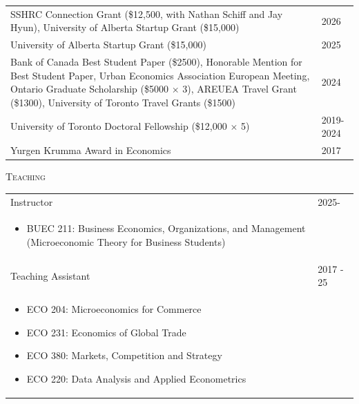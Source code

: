 \documentclass[11pt]{amsart}
\begin{document}
\normalsize 
\begin{tabular}{ p{12.5cm}  p{5cm}}
  SSHRC Connection Grant (\$12,500, with Nathan Schiff and Jay Hyun), University of Alberta Startup Grant (\$15,000) & 2026 \\ 
  University of Alberta Startup Grant (\$15,000) & 2025 \\
  Bank of Canada Best Student Paper (\$2500), Honorable Mention for Best Student Paper, Urban Economics Association European Meeting,   Ontario Graduate Scholarship (\$5000 $\times$ 3),  AREUEA Travel Grant (\$1300), University of Toronto Travel Grants (\$1500) & 2024 \\
  \vspace{1mm}
  University of Toronto Doctoral Fellowship  (\$12,000 $ \times$ 5) &   \vspace{1mm} 2019-2024 \\
  \vspace{1mm}
  Yurgen Krumma Award in Economics &   \vspace{1mm} 2017
\end{tabular}

\vspace{0.4cm}

\LARGE
\textsc{Teaching}
\vspace{0.2cm}
\normalsize

\begin{tabular}{ p{12.5cm} p{5cm}}
Instructor & 2025- \\
\begin{itemize}
	\item BUEC 211: Business Economics, Organizations, and Management (Microeconomic Theory for Business Students)
\end{itemize} & \\

Teaching Assistant & 2017 - 25 \\
\begin{itemize}
  \item ECO 204: Microeconomics for Commerce
  \item ECO 231: Economics of Global Trade
  \item ECO 380: Markets, Competition and Strategy
  \item ECO 220: Data Analysis and Applied Econometrics
\end{itemize} 
                                  
\end{tabular}
\end{document}
